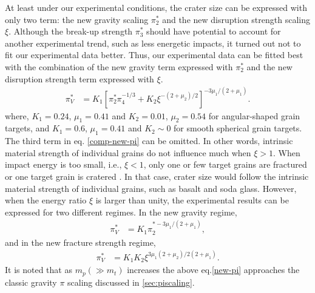 \documentclass[3p,authoryear]{elsarticle}
\begin{document}
At least under our experimental conditions, the crater size can be expressed with only two term: the new gravity scaling $\pi_2^*$ and the new disruption strength scaling $\xi$.
Although the break-up strength $\pi_3^*$ should have potential to account for another experimental trend, such as less energetic impacts, it turned out not to fit our experimental data better.
Thus, our experimental data can be fitted best with the combination of the new gravity term expressed with $\pi_2^*$ and the new disruption strength term expressed with $\xi$.
\begin{align}
	\pi_V^*&=K_1\left[\pi_2^{*}\pi_4^{-1/3}+K_2\xi^{-(2+\mu_2)/2}\right]^{-3\mu_1/(2+\mu_1)}. \label{new-pi}
\end{align}
where, $K_1=0.24 $, $\mu_1=0.41$ and $K_2=0.01$, $\mu_2=0.54$ for angular-shaped grain targets, and $K_1=0.6 $, $\mu_1=0.41$ and $K_2\sim 0$ for smooth spherical grain targets.
The third term in eq. \eqref{comp-new-pi} can be omitted.
In other words, intrinsic material strength of individual grains do not influence much when $\xi>1$.
When impact energy is too small, i.e., $\xi<1$, only one or few target grains are fractured or one target grain is cratered \citep{guettler2012}.
In that case, crater size would follow the intrinsic material strength of individual grains, such as basalt and soda glass.
However, when the energy ratio $\xi$ is larger than unity, the experimental results can be expressed for two different regimes. In the new gravity regime,
\begin{align}
	\pi_V^*&=K_1\pi_2^{*-3\mu_1/(2+\mu_1)}, \label{newgravity}
\end{align}
and in the new fracture strength regime,
\begin{align}
	\pi_V^*&=K_1K_2\xi^{3\mu_1(2+\mu_2)/2(2+\mu_1)}. \label{newstrength}
\end{align}
It is noted that as $m_p(\gg m_t)$ increases the above eq.\eqref{new-pi} approaches the classic gravity $\pi$ scaling discussed in \ref{sec:piscaling}.
\end{document}
